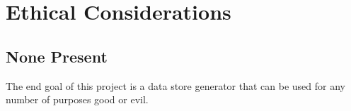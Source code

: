 \chapter{Ethical Considerations}
\section{None Present}
The end goal of this project is a data store generator that can be used for any
number of purposes good or evil.